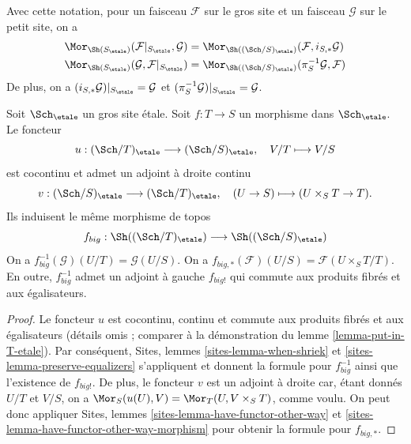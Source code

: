 \noindent
Avec cette notation, pour un faisceau $\mathcal{F}$ sur le
gros site et un faisceau $\mathcal{G}$ sur le petit site, on a
\begin{align*}
\Mor_{\Sh(S_\etale)}(
\mathcal{F}|_{S_\etale},
\mathcal{G})
& =
\Mor_{\Sh((\Sch/S)_\etale)}(
\mathcal{F},
i_{S, *}\mathcal{G}) \\
\Mor_{\Sh(S_\etale)}(
\mathcal{G},
\mathcal{F}|_{S_\etale})
& =
\Mor_{\Sh((\Sch/S)_\etale)}(
\pi_S^{-1}\mathcal{G},
\mathcal{F})
\end{align*}
De plus, on a $(i_{S, *}\mathcal{G})|_{S_\etale} = \mathcal{G}$
et $(\pi_S^{-1}\mathcal{G})|_{S_\etale} = \mathcal{G}$.

\begin{lemma}
\label{lemma-morphism-big-etale}
Soit $\Sch_\etale$ un gros site étale.
Soit $f : T \to S$ un morphisme dans $\Sch_\etale$.
Le foncteur
$$
u :
(\Sch/T)_\etale
\longrightarrow
(\Sch/S)_\etale,
\quad
V/T \longmapsto V/S
$$
est cocontinu et admet un adjoint à droite continu
$$
v :
(\Sch/S)_\etale
\longrightarrow
(\Sch/T)_\etale,
\quad
(U \to S) \longmapsto (U \times_S T \to T).
$$
Ils induisent le même morphisme de topos
$$
f_{big} :
\Sh((\Sch/T)_\etale)
\longrightarrow
\Sh((\Sch/S)_\etale)
$$
On a $f_{big}^{-1}(\mathcal{G})(U/T) = \mathcal{G}(U/S)$.
On a $f_{big, *}(\mathcal{F})(U/S) = \mathcal{F}(U \times_S T/T)$.
En outre, $f_{big}^{-1}$ admet un adjoint à gauche $f_{big!}$ qui commute aux
produits fibrés et aux égalisateurs.
\end{lemma}

\begin{proof}
Le foncteur $u$ est cocontinu, continu et commute aux produits fibrés
et aux égalisateurs (détails omis ; comparer à la démonstration du
lemme \ref{lemma-put-in-T-etale}).
Par conséquent,
Sites, lemmes \ref{sites-lemma-when-shriek} et
\ref{sites-lemma-preserve-equalizers}
s'appliquent et donnent la formule
pour $f_{big}^{-1}$ ainsi que l'existence de $f_{big!}$. De plus,
le foncteur $v$ est un adjoint à droite car, étant donnés $U/T$ et $V/S$,
on a $\Mor_S(u(U), V) = \Mor_T(U, V \times_S T)$,
comme voulu. On peut donc appliquer
Sites, lemmes \ref{sites-lemma-have-functor-other-way} et
\ref{sites-lemma-have-functor-other-way-morphism} pour obtenir la
formule pour $f_{big, *}$.
\end{proof}

